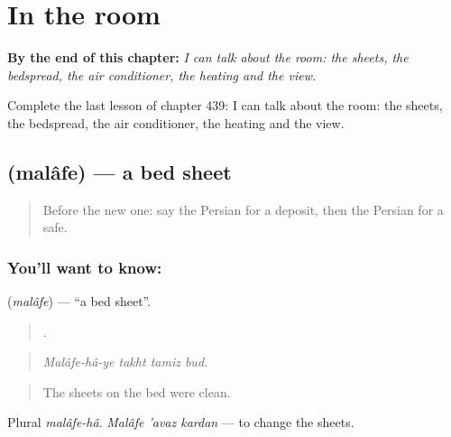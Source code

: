 
\chapter{In the room}
\label{ch:fa-in-the-room}

\begin{chapteropening}
\textbf{By the end of this chapter:} \emph{I can talk about the room: the sheets, the bedspread, the air conditioner, the heating and the view.}

Complete the last lesson of chapter 439: I can talk about the room: the sheets, the bedspread, the air conditioner, the heating and the view.
\end{chapteropening}

\section[\texorpdfstring{\fa{ملافه} (malâfe)}{ملافه (malâfe)}]{ (malâfe) — a bed sheet}

\label{lesson:FA-C439-malafe}



\begin{quote}
Before the new one: say the Persian for a deposit, then the Persian for a safe.
\end{quote}

\subsection*{You'll want to know: }
\textbf{} (\emph{malâfe}) — \textquotedblleft{}a bed sheet\textquotedblright{}.

\begin{quote}
    .
\end{quote}

\begin{quote}
\emph{Malâfe-hâ-ye takht tamiz bud.}
\end{quote}

\begin{quote}
The sheets on the bed were clean.
\end{quote}

Plural \emph{malâfe-hâ}. \emph{Malâfe 'avaz kardan} — to change the sheets.

